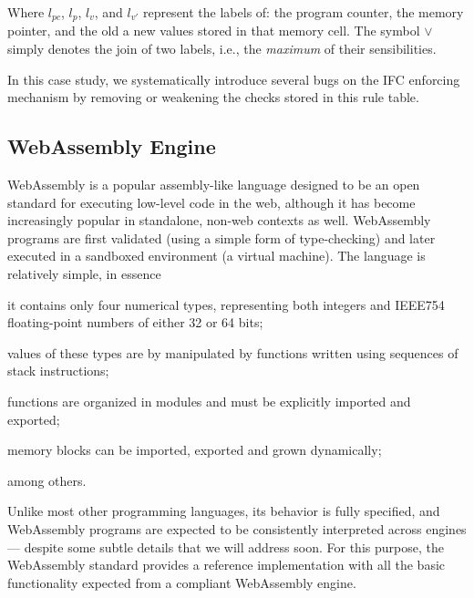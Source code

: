 \documentclass[acmsmall, anonymous]{acmart}
\begin{document}
Where $l_{pc}$, $l_{p}$, $l_{v}$, and $l_{v'}$ represent the labels of: the
program counter, the memory pointer, and the old a new values stored in that
memory cell.
%
The symbol $\vee$ simply denotes the join of two labels, i.e., the
\emph{maximum} of their sensibilities.

In this case study, we systematically introduce several bugs on the IFC
enforcing mechanism by removing or weakening the checks stored in this rule
table.

\subsection{WebAssembly Engine}

WebAssembly \cite{haas2017bringing} is a popular assembly-like language designed
to be an open standard for executing low-level code in the web, although it has
become increasingly popular in standalone, non-web contexts as well.
%
WebAssembly programs are first validated (using a simple form of type-checking)
and later executed in a sandboxed environment (a virtual machine).
%
%
The language is relatively simple, in essence
%
\begin{inparaenum}
  \item it contains only four numerical types, representing both integers and
    IEEE754 floating-point numbers of either 32 or 64 bits;
  \item values of these types are by manipulated by functions written using
    sequences of stack instructions;
  \item functions are organized in modules and must be explicitly imported and
    exported;
  \item memory blocks can be imported, exported and grown dynamically;
\end{inparaenum}
%
among others.
%


Unlike most other programming languages, its behavior is fully specified, and
WebAssembly programs are expected to be consistently interpreted across engines
--- despite some subtle details that we will address soon.
%
For this purpose, the WebAssembly standard provides a reference implementation
with all the basic functionality expected from a compliant WebAssembly engine.
\end{document}

